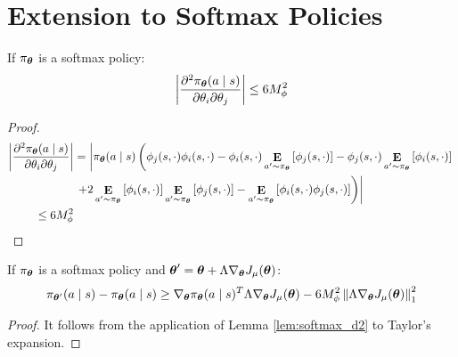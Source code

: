 \chapter{Extension to Softmax Policies}\label{app:softmax}

\begin{lemma}\label{lem:softmax_d2}
If $\pi_{\vtheta}$ is a softmax policy:
\[
\left| \frac{\partial^2\pi_{\vtheta}(a \mid s)}
	{\partial\theta_i\partial\theta_j}\right| \leq
	6M_{\phi}^2
\]
\end{lemma}
\begin{proof}
\begin{align*}
\left|\frac{\partial^2\pi_{\vtheta}(a \mid s)}
		{\partial\theta_i\partial\theta_j}\right|
		&= \left| \pi_{\vtheta}(a\mid s)\left(
		\phi_j(s,\cdot)\phi_i(s,\cdot) -  \phi_i(s,\cdot)\expected{a'}{\pi_{\vtheta}}{\phi_j(s,\cdot)} - \phi_j(s,\cdot)\expected{a'}{\pi_{\vtheta}}{\phi_i(s,\cdot)}\right.\right. \\
		&\left.\left.+ 2\expected{a'}{\pi_{\vtheta}}{\phi_i(s,\cdot)}\expected{a'}{\pi_{\vtheta}}{\phi_j(s,\cdot)} - \expected{a'}{\pi_{\vtheta}}{\phi_i(s,\cdot)\phi_j(s,\cdot)}\right)\right| \\
		\leq 6M_\phi^2
\end{align*}
\end{proof}

\begin{lemma}\label{lem:softmax_diff}
If $\pi_{\vtheta}$ is a softmax policy and $\vtheta' = \vtheta+\Lambda\gradJ{\vtheta}$:
\[
\pi_{\vtheta'}(a \mid s) - \pi_{\vtheta}(a \mid s) \geq 
	\nabla_{\vtheta}\pi_{\vtheta}(a \mid s)^T\Lambda\gradJ{\vtheta} -
	6M_{\phi}^2\norm[1]{\Lambda\gradJ{\vtheta}}^2
\]
\end{lemma}
\begin{proof}
It follows from the application of Lemma \ref{lem:softmax_d2} to Taylor's expansion.
\end{proof}

